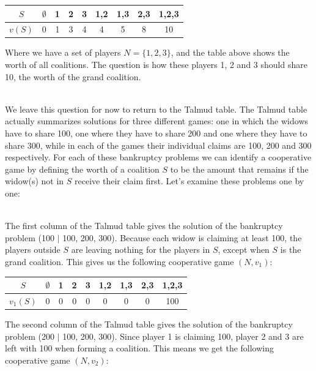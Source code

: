 \documentclass[12pt]{article}
\begin{document}
\begin{table}[h]
    \centering
    \begin{tabular}{|c|cccccccc|}
    \hline
    $S$ & $\emptyset$ & 1 & 2 & 3 & 1,2 & 1,3 & 2,3 & 1,2,3 \\ \hline
    $v(S)$ & 0 & 1 & 3 & 4 & 4 & 5 & 8 & 10 \\ \hline
    \end{tabular}
\end{table}

\noindent
Where we have a set of players $N = \{1, 2, 3\}$, and the table above shows the worth of all coalitions.
The question is how these players 1, 2 and 3 should share 10, the worth of the grand coalition.

\noindent
\\
We leave this question for now to return to the Talmud table.
The Talmud table actually summarizes solutions for three different games: one in which the widows have to share 100, one where they have to share 200 and one where they have to share 300, while in each of the games their individual claims are 100, 200 and 300 respectively.
For each of these bankruptcy problems we can identify a cooperative game by defining the worth of a coalition $S$ to be the amount that remains if the widow(s) not in $S$ receive their claim first.
Let's examine these problems one by one:

\noindent
\\
The first column of the Talmud table gives the solution of the bankruptcy problem (100 $|$ 100, 200, 300).
Because each widow is claiming at least 100, the players outside $S$ are leaving nothing for the players in $S$, except when $S$ is the grand coalition.
This gives us the following cooperative game $(N, v_1)$:

\begin{table}[h]
    \centering
    \begin{tabular}{|c|cccccccc|}
    \hline
    $S$ & $\emptyset$ & 1 & 2 & 3 & 1,2 & 1,3 & 2,3 & 1,2,3 \\ \hline
    $v_1(S)$ & 0 & 0 & 0 & 0 & 0 & 0 & 0 & 100 \\ \hline
    \end{tabular}
\end{table}

\noindent
The second column of the Talmud table gives the solution of the bankruptcy problem (200 $|$ 100, 200, 300).
Since player 1 is claiming 100, player 2 and 3 are left with 100 when forming a coalition.
This means we get the following cooperative game $(N, v_2)$:
\end{document}
